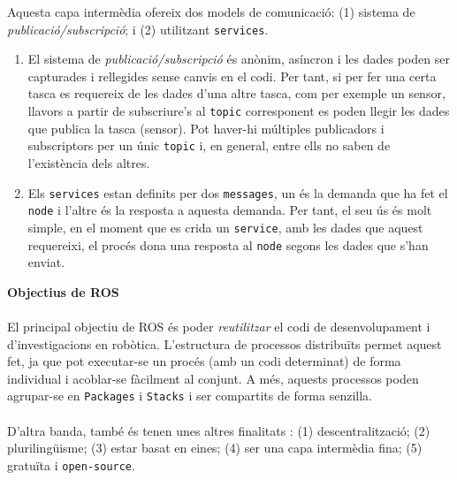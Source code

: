 \documentclass[12pt,a4paper,final,twoside]{article}
\begin{document}
Aquesta capa intermèdia ofereix dos models de comunicació: (1) sistema de \textit{publicació/subscripció}; i (2) utilitzant \texttt{services}.
\begin{enumerate}
\item El sistema de \textit{publicació/subscripció} és anònim, asíncron i les dades poden ser capturades i rellegides sense canvis en el codi. Per tant, si per fer una certa tasca es requereix de les dades d'una altre tasca, com per exemple un sensor, llavors a partir de subscriure's al \texttt{topic} corresponent es poden llegir les dades que publica la tasca (sensor). Pot haver-hi múltiples publicadors i subscriptors per un únic \texttt{topic} i, en general, entre ells no saben de l'existència dels altres.

\item Els \texttt{services} estan definits per dos \texttt{messages}, un és la demanda que ha fet el \texttt{node} i l'altre és la resposta a aquesta demanda. Per tant, el seu ús és molt simple, en el moment que es crida un \texttt{service}, amb les dades que aquest requereixi, el procés dona una resposta al \texttt{node} segons les dades que s'han enviat.
\end{enumerate}


\vspace{20pt}
\textbf{Objectius de ROS}

\paragraph{}El principal objectiu de ROS és poder \textit{reutilitzar} el codi de desenvolupament i d'investigacions en robòtica. L'estructura de processos distribuïts permet aquest fet, ja que pot executar-se un procés (amb un codi determinat) de forma individual i acoblar-se fàcilment al conjunt. A més, aquests processos poden agrupar-se en \texttt{Packages} i \texttt{Stacks} i ser compartits de forma senzilla.

\paragraph{}D'altra banda, també és tenen unes altres finalitats \cite{Quigley}: (1) descentralització; (2) plurilingüisme; (3) estar basat en eines; (4) ser una capa intermèdia fina; (5) gratuïta i \texttt{open-source}.
\end{document}
